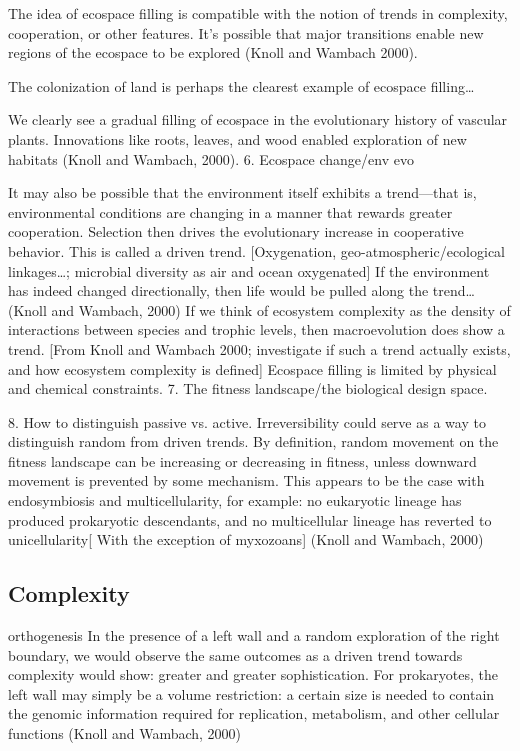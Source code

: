 \documentclass{tufte-book} %
\begin{document}
The idea of ecospace filling is compatible with the notion of trends in complexity, cooperation, or other features. It’s possible that major transitions enable new regions of the ecospace to be explored (Knoll and Wambach 2000). 

The colonization of land is perhaps the clearest example of ecospace filling…

We clearly see a gradual filling of ecospace in the evolutionary history of vascular plants. Innovations like roots, leaves, and wood enabled exploration of new habitats (Knoll and Wambach, 2000). 
6. Ecospace change/env evo

It may also be possible that the environment itself exhibits a trend—that is, environmental conditions are changing in a manner that rewards greater cooperation. Selection then drives the evolutionary increase in cooperative behavior.  This is called a driven trend. 
[Oxygenation, geo-atmospheric/ecological linkages…; microbial diversity as air and ocean oxygenated]
If the environment has indeed changed directionally, then life would be pulled along the trend…(Knoll and Wambach, 2000)
If we think of ecosystem complexity as the density of interactions between species and trophic levels, then macroevolution does show a trend. [From Knoll and Wambach 2000; investigate if such a trend actually exists, and how ecosystem complexity is defined] 
Ecospace filling is limited by physical and chemical constraints.
7. The fitness landscape/the biological design space.

8. How to distinguish passive vs. active.
Irreversibility could serve as a way to distinguish random from driven trends. By definition, random movement on the fitness landscape can be increasing or decreasing in fitness, unless downward movement is prevented by some mechanism. This appears to be the case with endosymbiosis and multicellularity, for example: no eukaryotic lineage has produced prokaryotic descendants, and no multicellular lineage has reverted to unicellularity[ With the exception of myxozoans] (Knoll and Wambach, 2000)



\subsection{Complexity}\label{arrow:complexity}

orthogenesis
In the presence of a left wall and a random exploration of the right boundary, we would observe the same outcomes as a driven trend towards complexity would show: greater and greater sophistication. 
For prokaryotes, the left wall may simply be a volume restriction: a certain size is needed to contain the genomic information required for replication, metabolism, and other cellular functions (Knoll and Wambach, 2000)
\end{document}
